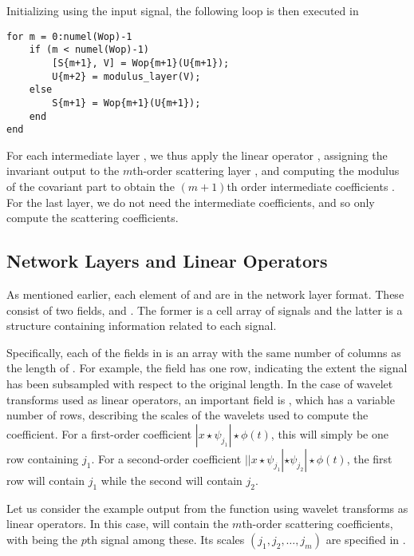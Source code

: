 \documentclass[twocolumn]{article}
\begin{document}
Initializing  using the input signal, the following loop is then executed in 
\begin{lstlisting}
for m = 0:numel(Wop)-1
	if (m < numel(Wop)-1)
		[S{m+1}, V] = Wop{m+1}(U{m+1});
		U{m+2} = modulus_layer(V);
	else
		S{m+1} = Wop{m+1}(U{m+1});
	end
end
\end{lstlisting}
For each intermediate layer , we thus apply the linear operator , assigning the invariant output to the $m$th-order scattering layer , and computing the modulus of the covariant part to obtain the $(m+1)$th order intermediate coefficients . For the last layer, we do not need the intermediate coefficients, and so only compute the scattering coefficients.

\subsection{Network Layers  and Linear Operators }

As mentioned earlier, each element of  and  are in the network layer format. These consist of two fields,  and . The former is a cell array of signals and the latter is a structure containing information related to each signal.

Specifically, each of the fields in  is an array with the same number of columns as the length of . For example, the  field has one row, indicating the extent the signal has been subsampled with respect to the original length. In the case of wavelet transforms used as linear operators, an important field is , which has a variable number of rows, describing the scales of the wavelets used to compute the coefficient. For a first-order coefficient $|x\star\psi_{j_1}|\star\phi(t)$, this will simply be one row containing $j_1$. For a second-order coefficient $||x\star\psi_{j_1}|\star\psi_{j_2}|\star\phi(t)$, the first row will contain $j_1$ while the second will contain $j_2$.

Let us consider the example output  from the  function using wavelet transforms as linear operators. In this case,  will contain the $m$th-order scattering coefficients, with  being the $p$th signal among these. Its scales $(j_1,j_2,\ldots,j_m)$ are specified in .
\end{document}
